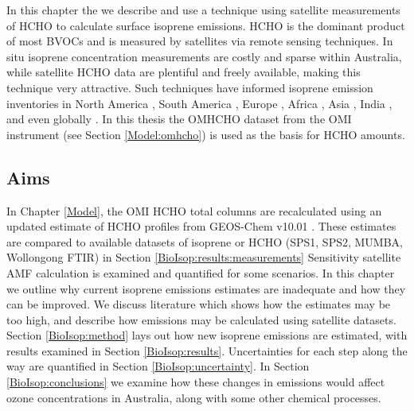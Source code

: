   In this chapter the we describe and use a technique using satellite measurements of HCHO to calculate surface isoprene emissions.
  HCHO is the dominant product of most BVOCs and is measured by satellites via remote sensing techniques.
  In situ isoprene concentration measurements are costly and sparse within Australia, while satellite HCHO data are plentiful and freely available, making this technique very attractive.
  Such techniques have informed isoprene emission inventories in North America \parencite{Abbot2003,Palmer2003,Palmer2006,Millet2006,Millet2008}, South America \parencite{Barkley2013}, Europe \parencite{Dufour2009,Curci2010}, Africa \parencite{Marais2012}, Asia \parencite{Fu2007,Stavrakou2014}, India \parencite{Surl2018}, and even globally \parencite{Shim2005,FortemsCheiney2012,Bauwens2016}.
  In this thesis the OMHCHO dataset from the OMI instrument (see Section \ref{Model:omhcho}) is used as the basis for HCHO amounts.
  
  \subsection{Aims}
    
    In Chapter \ref{Model}, the OMI HCHO total columns are recalculated using an updated estimate of HCHO profiles from GEOS-Chem v10.01 .
    These estimates are compared to available datasets of isoprene or HCHO (SPS1, SPS2, MUMBA, Wollongong FTIR) in Section \ref{BioIsop:results:measurements} %
    Sensitivity satellite AMF calculation is examined and quantified for some scenarios.
    In this chapter we outline why current isoprene emissions estimates are inadequate and how they can be improved.
    We discuss literature which shows how the estimates may be too high, and describe how emissions may be calculated using satellite datasets.
    Section \ref{BioIsop:method} lays out how new isoprene emissions are estimated, with results examined in Section \ref{BioIsop:results}. 
    Uncertainties for each step along the way are quantified in Section \ref{BioIsop:uncertainty}.
    In Section \ref{BioIsop:conclusions} we examine how these changes in emissions would affect ozone concentrations in Australia, along with some other chemical processes.
    
